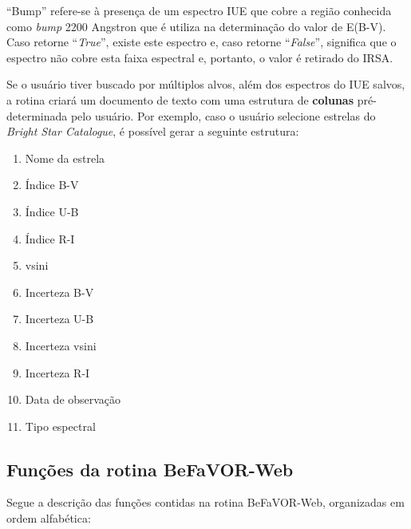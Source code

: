 \documentclass[letterpaper,10pt,english]{sphinxmanual}
\begin{document}
``Bump'' refere-se à presença de um espectro IUE que cobre a região conhecida como \emph{bump} 2200 Angstron que é utiliza na determinação do valor de E(B-V). Caso retorne ``\emph{True}'', existe este espectro e, caso retorne ``\emph{False}'', significa que o espectro não cobre esta faixa espectral e, portanto, o valor é retirado do IRSA.

Se o usuário tiver buscado por múltiplos alvos, além dos espectros do IUE salvos, a rotina criará um documento de texto com uma estrutura de \textbf{colunas} pré-determinada pelo usuário. Por exemplo, caso o usuário selecione estrelas do \emph{Bright Star Catalogue}, é possível gerar a seguinte estrutura:
\begin{enumerate}
\item {} 
Nome da estrela

\item {} 
Índice B-V

\item {} 
Índice U-B

\item {} 
Índice R-I

\item {} 
vsini

\item {} 
Incerteza B-V

\item {} 
Incerteza U-B

\item {} 
Incerteza vsini

\item {} 
Incerteza R-I

\item {} 
Data de observação

\item {} 
Tipo espectral

\end{enumerate}


\subsection{Funções da rotina BeFaVOR-Web}
\label{index:funcoes-da-rotina-befavor-web}
Segue a descrição das funções contidas na rotina BeFaVOR-Web, organizadas em ordem alfabética:
\label{index:module-BeFaVOr_web}
\end{document}
